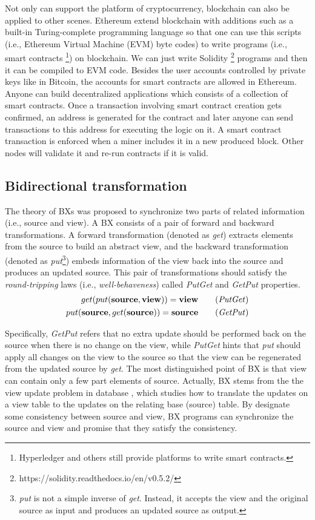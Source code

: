 \documentclass[conference]{IEEEtran}
\begin{document}
	Not only can support the platform of cryptocurrency, blockchain can also be applied to other scenes. Ethereum \cite{wood2014ethereum} extend blockchain with additions such as a built-in Turing-complete programming language so that one can use this scripts (i.e., Ethereum Virtual Machine (EVM) byte codes) to write programs (i.e., smart contracts \footnote{Hyperledger and others still provide platforms to write smart contracts.}) on blockchain. We can just write Solidity \footnote{https://solidity.readthedocs.io/en/v0.5.2/} programs and then it can be compiled to EVM code. Besides the user accounts controlled by private keys like in Bitcoin, the accounts for smart contracts are allowed in Ethereum. Anyone can build decentralized applications which consists of a collection of smart contracts. Once a transaction involving smart contract creation gets confirmed, an address is generated for the contract and later anyone can send transactions to this address for executing the logic on it. A smart contract transaction is enforced when a miner includes it in a new produced block. Other nodes will validate it and re-run contracts if it is valid.
	
	\subsection{Bidirectional transformation}
	The theory of BXs was proposed to synchronize two parts of related information (i.e., source and view).  A BX consists of a pair of forward and backward transformations. A forward transformation (denoted as \emph{get}) extracts elements from the source to build an abstract view, and the backward transformation (denoted as \emph{put}\footnote{\emph{put} is not a simple inverse of \emph{get}. Instead, it accepts the view and the original source as input and produces an updated source as output.}) embeds information of the view back into the source and produces an updated source. This pair of transformations should satisfy the {\em round-tripping} laws (i.e., {\em well-behaveness}) called \emph{PutGet} and \emph{GetPut} properties. 
	\begin{align}
	get (put(\textbf{source}, \textbf{view}))= \textbf{view} \tag {\emph{PutGet}} \\
	put (\textbf{source}, get (\textbf{source})) = \textbf{source} \tag {\emph{GetPut}} 
	\end{align}
	
	Specifically, \emph{GetPut} refers that no extra update should be performed back on the source when there is no change on the view, while \emph{PutGet} hints that \emph{put} should apply all changes on the view to the source so that the view can be regenerated from the updated source by \emph{get}. The most distinguished point of BX is that view can contain only a few part elements of source. Actually, BX stems from the the view update problem in database \cite{bancilhon1981update}, which studies how to translate the updates on a view table to the updates on the relating base (source) table. By designate some consistency between source and view, BX programs can synchronize the source and view and promise that they satisfy the consistency.
	
\end{document}
